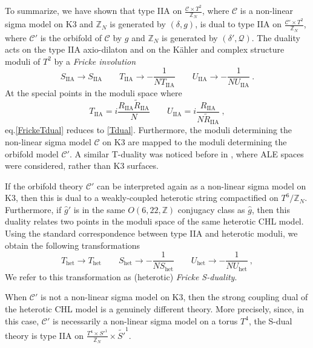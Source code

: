 \documentclass[a4paper,11pt]{article}
\newcommand{\ZZ}{\mathbb{Z}}
\newcommand{\C}{\mathcal{C}}
\newcommand{\Q}{\mathcal{Q}}
\numberwithin{equation}{section}
\def\be{\begin{equation}}
\def\ee{\end{equation}}
\begin{document}
\bigskip

To summarize, we have shown that type IIA on $\frac{\C\times T^2}{\ZZ_N}$, where $\C$ is a non-linear sigma model on K3 and $\ZZ_N$ is generated by $(\delta,g)$, is dual to type IIA on $\frac{\C'\times T^2}{\ZZ_N}$, where $\C'$ is the orbifold of $\C$ by $g$ and $\ZZ_N$ is generated by $(\delta',\Q)$. The duality acts on the type IIA axio-dilaton and on the K\"ahler and complex structure moduli of $T^2$ by a \emph{Fricke involution}
\be\label{FrickeTdual} S_{\text{IIA}}\to S_{\text{IIA}}\qquad T_{\text{IIA}}\to -\frac{1}{NT_{\text{IIA}}}\qquad U_{\text{IIA}}\to -\frac{1}{NU_{\text{IIA}}}\ .
\ee At the special points in the moduli space where
\be T_{\text{IIA}}=i\frac{R_{\text{IIA}}\tilde R_{\text{IIA}}}{N}\qquad U_{\text{IIA}}=i\frac{R_{\text{IIA}}}{N\tilde R_{\text{IIA}}}\ ,
\ee eq.\eqref{FrickeTdual} reduces to \eqref{Tdual}. Furthermore, the moduli determining the non-linear sigma model $\C$ on K3 are mapped to the moduli determining the orbifold model $\C'$. A similar T-duality was noticed before in  \cite{Vafa:1997mh}, where ALE spaces were considered, rather than K3 surfaces.

\bigskip

If the orbifold theory $\C'$ can be interpreted again as a non-linear sigma model on K3, then this is dual to a weakly-coupled heterotic string compactified on ${T^6}/{\ZZ_{N}}$. Furthermore, if $\hat g'$ is in the same $O(6,22,\ZZ)$ conjugacy class as $\hat g$, then this duality relates two points in the moduli space of the same heterotic CHL model. 
Using the standard correspondence between type IIA and heterotic moduli, we obtain the following transformations
\be\label{hetmodSdual} T_{\text{het}}\to T_{\text{het}}\qquad S_{\text{het}}\to -\frac{1}{NS_{\text{het}}}\qquad U_{\text{het}}\to -\frac{1}{NU_{\text{het}}}\ ,
\ee
We refer to this transformation as (heterotic) \emph{Fricke S-duality}.

\bigskip
 
 
When $\C'$ is not a non-linear sigma model on K3, then the strong coupling dual of the heterotic CHL model is a genuinely different theory. More precisely, since, in this case, $\C'$ is necessarily a non-linear sigma model on a torus $T^4$, the S-dual theory is type IIA on $\frac{T^4\times {S'}^1}{\ZZ_{N}}\times \tilde {S'}^1$.  
\end{document}
